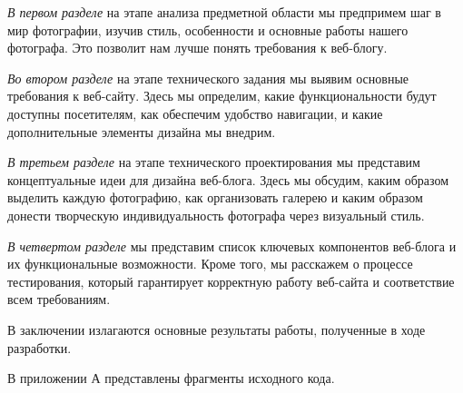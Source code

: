 \emph{В первом разделе} на этапе анализа предметной области мы предпримем шаг в мир фотографии, изучив стиль, особенности и основные работы нашего фотографа. Это позволит нам лучше понять требования к веб-блогу.

\emph{Во втором разделе} на этапе технического задания мы выявим основные требования к веб-сайту. Здесь мы определим, какие функциональности будут доступны посетителям, как обеспечим удобство навигации, и какие дополнительные элементы дизайна мы внедрим.

\emph{В третьем разделе} на этапе технического проектирования мы представим концептуальные идеи для дизайна веб-блога. Здесь мы обсудим, каким образом выделить каждую фотографию, как организовать галерею и каким образом донести творческую индивидуальность фотографа через визуальный стиль.

\emph{В четвертом разделе} мы представим список ключевых компонентов веб-блога и их функциональные возможности. Кроме того, мы расскажем о процессе тестирования, который гарантирует корректную работу веб-сайта и соответствие всем требованиям.

В заключении излагаются основные результаты работы, полученные в ходе разработки.

В приложении А представлены фрагменты исходного кода. 
